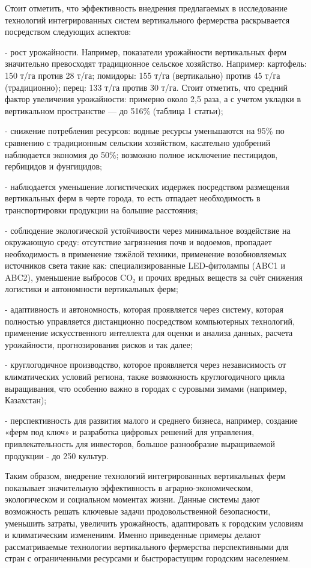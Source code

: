 Стоит отметить, что эффективность внедрения предлагаемых в исследование
технологий интегрированных систем вертикального фермерства раскрывается
посредством следующих аспектов:

- рост урожайности. Например, показатели урожайности вертикальных ферм
значительно превосходят традиционное сельское хозяйство. Например:
картофель: 150 т/га против 28 т/га; помидоры: 155 т/га (вертикально)
против 45 т/га (традиционно); перец: 133 т/га против 30 т/га. Стоит
отметить, что средний фактор увеличения урожайности: примерно около 2,5
раза, а с учетом укладки в вертикальном пространстве --- до 516\%
(таблица 1 статьи);

- снижение потребления ресурсов: водные ресурсы уменьшаются на 95\% по
сравнению с традиционным сельскии хозяйством, касательно удобрений
наблюдается экономия до 50\%; возможно полное исключение пестицидов,
гербицидов и фунгицидов;

- наблюдается уменьшение логистических издержек посредством размещения
вертикальных ферм в черте города, то есть отпадает необходимость в
транспортировки продукции на большие расстояния;

- соблюдение экологической устойчивости через минимальное воздействие на
окружающую среду: отсутствие загрязнения почв и водоемов, пропадает
необходимость в применение тяжёлой техники, применение возобновляемых
источников света такие как: специализированные LED-фитолампы (ABC1 и
ABC2), уменьшение выбросов CO₂ и прочих вредных веществ за счёт снижения
логистики и автономности вертикальных ферм;

- адаптивность и автономность, которая проявляется через систему,
которая полностью управляется дистанционно посредством компьютерных
технологий, применение искусственного интеллекта для оценки и анализа
данных, расчета урожайности, прогнозирования рисков и так далее;

- круглогодичное производство, которое проявляется через независимость
от климатических условий региона, также возможность круглогодичного
цикла выращивания, что особенно важно в городах с суровыми зимами
(например, Казахстан);

- перспективность для развития малого и среднего бизнеса, например,
создание «ферм под ключ» и разработка цифровых решений для управления,
привлекательность для инвесторов, большое разнообразие выращиваемой
продукции - до 250 культур.

Таким образом, внедрение технологий интегрированных вертикальных ферм
показывает значительную эффективность в аграрно-экономическом,
экологическом и социальном моментах жизни. Данные системы дают
возможность решать ключевые задачи продовольственной безопасности,
уменьшить затраты, увеличить урожайность, адаптировать к городским
условиям и климатическим изменениям. Именно приведенные примеры делают
рассматриваемые технологии вертикального фермерства перспективными для
стран с ограниченными ресурсами и быстрорастущим городским населением.

